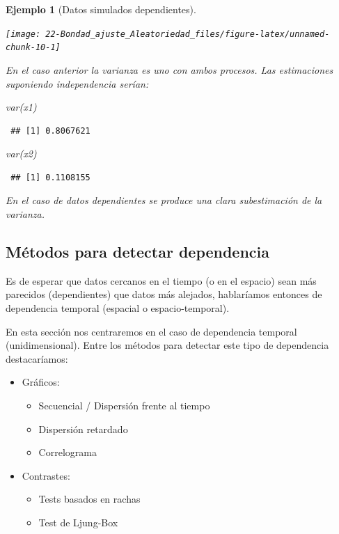 \documentclass[
]{book}
\newenvironment{Shaded}{\begin{snugshade}}{\end{snugshade}}
\newcommand{\FunctionTok}[1]{\textcolor[rgb]{0.00,0.00,0.00}{#1}}
\newcommand{\NormalTok}[1]{#1}
\theoremstyle{break}
\newtheorem{example}{Ejemplo}[chapter]
\theoremstyle{nonumberplain}
\begin{document}
\begin{example}[Datos simulados dependientes]
\begin{center}\texttt{[image: 22-Bondad\_ajuste\_Aleatoriedad\_files/figure-latex/unnamed-chunk-10-1]} \end{center}

En el caso anterior la varianza es uno con ambos procesos.
Las estimaciones suponiendo independencia serían:

\begin{Shaded}
\begin{Highlighting}[]
\FunctionTok{var}\NormalTok{(x1)}
\end{Highlighting}
\end{Shaded}

\begin{verbatim}
 ## [1] 0.8067621
\end{verbatim}

\begin{Shaded}
\begin{Highlighting}[]
\FunctionTok{var}\NormalTok{(x2)}
\end{Highlighting}
\end{Shaded}

\begin{verbatim}
 ## [1] 0.1108155
\end{verbatim}

En el caso de datos dependientes se produce una clara subestimación de la varianza.
\end{example}

\hypertarget{muxe9todos-para-detectar-dependencia}{%
\subsection{Métodos para detectar dependencia}\label{muxe9todos-para-detectar-dependencia}}

Es de esperar que datos cercanos en el tiempo (o en el espacio)
sean más parecidos (dependientes) que datos más alejados, hablaríamos entonces de dependencia temporal (espacial o espacio-temporal).

En esta sección nos centraremos en el caso de dependencia temporal (unidimensional).
Entre los métodos para detectar este tipo de dependencia destacaríamos:

\begin{itemize}
\item
  Gráficos:

  \begin{itemize}
  \item
    Secuencial / Dispersión frente al tiempo
  \item
    Dispersión retardado
  \item
    Correlograma
  \end{itemize}
\item
  Contrastes:

  \begin{itemize}
  \item
    Tests basados en rachas
  \item
    Test de Ljung-Box
  \end{itemize}
\end{itemize}
\end{document}
